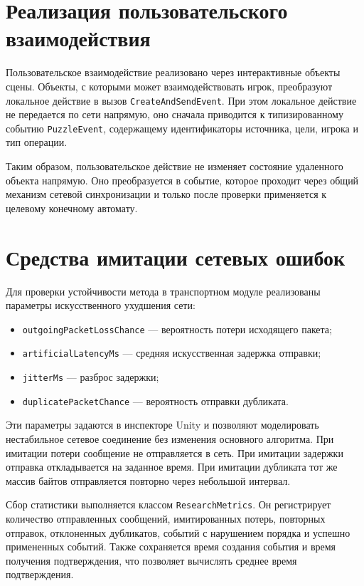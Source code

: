 \section{Реализация пользовательского взаимодействия}

Пользовательское взаимодействие реализовано через интерактивные объекты сцены. Объекты, с которыми может взаимодействовать игрок, преобразуют локальное действие в вызов \texttt{CreateAndSendEvent}.
При этом локальное действие не передается по сети напрямую, оно сначала приводится к типизированному событию \texttt{PuzzleEvent}, содержащему идентификаторы источника, цели, игрока и тип операции.

Таким образом, пользовательское действие не изменяет состояние удаленного объекта напрямую. Оно преобразуется в событие, которое проходит через общий механизм сетевой синхронизации и только после проверки применяется к целевому конечному автомату.

\section{Средства имитации сетевых ошибок}

Для проверки устойчивости метода в транспортном модуле реализованы параметры искусственного ухудшения сети:
\begin{itemize}
	\item \texttt{outgoingPacketLossChance} --- вероятность потери исходящего пакета;
	\item \texttt{artificialLatencyMs} --- средняя искусственная задержка отправки;
	\item \texttt{jitterMs} --- разброс задержки;
	\item \texttt{duplicatePacketChance} --- вероятность отправки дубликата.
\end{itemize}

Эти параметры задаются в инспекторе Unity и позволяют моделировать нестабильное сетевое соединение без изменения основного алгоритма. При имитации потери сообщение не отправляется в сеть. При имитации задержки отправка откладывается на заданное время. При имитации дубликата тот же массив байтов отправляется повторно через небольшой интервал.

Сбор статистики выполняется классом \texttt{ResearchMetrics}. Он регистрирует количество отправленных сообщений, имитированных потерь, повторных отправок, отклоненных дубликатов, событий с нарушением порядка и успешно примененных событий. Также сохраняется время создания события и время получения подтверждения, что позволяет вычислять среднее время подтверждения.

